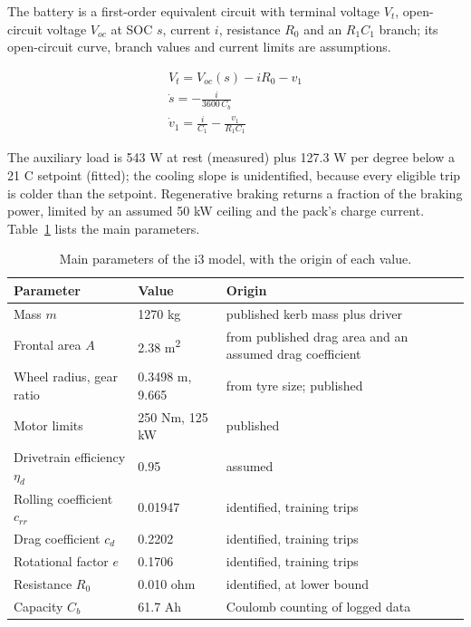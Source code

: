 \documentclass{ieeeaccess}
\begin{document}
The battery is a first-order equivalent circuit with terminal voltage $V_{t}$, open-circuit voltage $V_{oc}$ at SOC $s$, current $i$, resistance $R_{0}$ and an $R_{1}C_{1}$ branch; its open-circuit curve, branch values and current limits are assumptions.

\begin{equation}
\label{eq:plant-battery}
\begin{gathered}V_{t} = V_{oc}(s) - i R_{0} - v_{1} \\ \dot{s} = -\frac{i}{3600\,C_{b}} \\ \dot{v}_{1} = \frac{i}{C_{1}} - \frac{v_{1}}{R_{1}C_{1}}\end{gathered}
\end{equation}

The auxiliary load is 543 W at rest (measured) plus 127.3 W per degree below a 21 \textdegree{}C setpoint (fitted); the cooling slope is unidentified, because every eligible trip is colder than the setpoint. Regenerative braking returns a fraction of the braking power, limited by an assumed 50 kW ceiling and the pack's charge current. Table~\ref{tab:plant-params} lists the main parameters.

\begin{table}[!t]
\centering
\caption{Main parameters of the i3 model, with the origin of each value.}
\label{tab:plant-params}
\footnotesize
\setlength{\tabcolsep}{3pt}
\renewcommand{\arraystretch}{1.15}
\begin{tabularx}{\columnwidth}{@{}XXX@{}}
\hline
\textbf{Parameter} & \textbf{Value} & \textbf{Origin} \\
\hline
Mass $m$ & 1270 kg & published kerb mass plus driver \\
Frontal area $A$ & 2.38 m\textsuperscript{2} & from published drag area and an assumed drag coefficient \\
Wheel radius, gear ratio & 0.3498 m, 9.665 & from tyre size; published \\
Motor limits & 250 Nm, 125 kW & published \\
Drivetrain efficiency $\eta_{d}$ & 0.95 & assumed \\
Rolling coefficient $c_{rr}$ & 0.01947 & identified, training trips \\
Drag coefficient $c_{d}$ & 0.2202 & identified, training trips \\
Rotational factor $e$ & 0.1706 & identified, training trips \\
Resistance $R_{0}$ & 0.010 ohm & identified, at lower bound \\
Capacity $C_{b}$ & 61.7 Ah & Coulomb counting of logged data \\
\hline
\end{tabularx}
\end{table}
\end{document}
